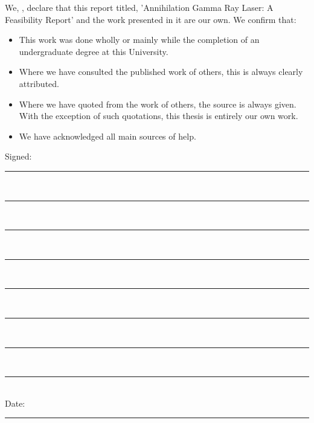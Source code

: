 \documentclass[11pt, english, singlespacing, headsepline,]{FinalReport}
\begin{document}

\begin{declaration}
\addchaptertocentry{\authorshipname}

\noindent We, \authorname, declare that this report titled, 'Annihilation Gamma Ray Laser: A Feasibility Report' and the work presented in it are our own. We confirm that:

\begin{itemize} 
\item This work was done wholly or mainly while the completion of an undergraduate degree at this University.
\item Where we have consulted the published work of others, this is always clearly attributed.
\item Where we have quoted from the work of others, the source is always given. With the exception of such quotations, this thesis is entirely our own work.
\item We have acknowledged all main sources of help.
\end{itemize}
 
\noindent Signed:\\
\rule[0.5em]{25em}{0.5pt}\\ %
\rule[0.5em]{25em}{0.5pt}\\
\rule[0.5em]{25em}{0.5pt}\\
\rule[0.5em]{25em}{0.5pt}\\
\rule[0.5em]{25em}{0.5pt}\\
\rule[0.5em]{25em}{0.5pt}\\
\rule[0.5em]{25em}{0.5pt}\\
\rule[0.5em]{25em}{0.5pt}\\
 
\noindent Date:\\
\rule[0.5em]{25em}{0.5pt} %
\end{declaration}

\cleardoublepage


\vspace*{0.2\textheight}
\end{document}
